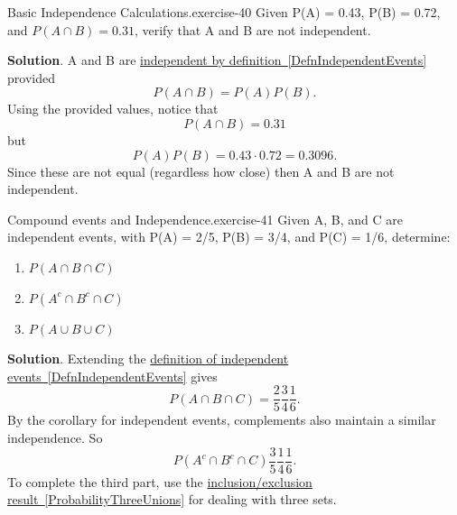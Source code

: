 \documentclass[10pt,]{book}
\numberwithin{equation}{section}
\begin{document}
%
\par
\hypertarget{p-627}{}%
\begin{inlineexercise}{Basic Independence Calculations.}{exercise-40}%
\hypertarget{p-628}{}%
Given P(A) = 0.43, P(B) = 0.72, and \(P(A \cap B) = 0.31\), verify that A and B are not independent.%
\par\smallskip%
\noindent\textbf{Solution}.\hypertarget{solution-18}{}\quad%
\hypertarget{p-629}{}%
A and B are \hyperref[DefnIndependentEvents]{independent by definition~\ref{DefnIndependentEvents}} provided%
\begin{equation*}
P(A \cap B) = P(A) P(B).
\end{equation*}
Using the provided values, notice that%
\begin{equation*}
P(A \cap B) = 0.31
\end{equation*}
but%
\begin{equation*}
P(A)P(B) = 0.43 \cdot 0.72 = 0.3096.
\end{equation*}
Since these are not equal (regardless how close) then A and B are not independent.%
\end{inlineexercise}
%
\par
\hypertarget{p-630}{}%
\begin{inlineexercise}{Compound events and Independence.}{exercise-41}%
\hypertarget{p-631}{}%
Given A, B, and C are independent events, with P(A) = 2/5, P(B) = 3/4, and P(C) = 1/6, determine: \leavevmode%
\begin{enumerate}
\item\hypertarget{li-182}{}\(P(A \cap B \cap C)\)%
\item\hypertarget{li-183}{}\(P(A^c \cap B^c \cap C)\)%
\item\hypertarget{li-184}{}\(P(A \cup B \cup C)\)%
\end{enumerate}
%
\par\smallskip%
\noindent\textbf{Solution}.\hypertarget{solution-19}{}\quad%
\hypertarget{p-632}{}%
Extending the \hyperref[DefnIndependentEvents]{definition of independent events~\ref{DefnIndependentEvents}} gives%
\begin{equation*}
P(A \cap B \cap C) = \frac{2}{5} \frac{3}{4} \frac{1}{6}.
\end{equation*}
By the corollary for independent events, complements also maintain a similar independence. So%
\begin{equation*}
P(A^c \cap B^c \cap C) \frac{3}{5} \frac{1}{4} \frac{1}{6} .
\end{equation*}
To complete the third part, use the \hyperref[ProbabilityThreeUnions]{inclusion/exclusion result~\ref{ProbabilityThreeUnions}} for dealing with three sets.%
\end{inlineexercise}
\end{document}
